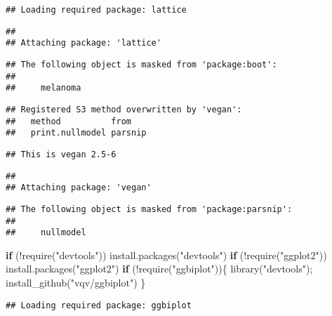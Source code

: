 \documentclass[
]{book}
\newenvironment{Shaded}{\begin{snugshade}}{\end{snugshade}}
\newcommand{\ControlFlowTok}[1]{\textcolor[rgb]{0.13,0.29,0.53}{\textbf{#1}}}
\newcommand{\FunctionTok}[1]{\textcolor[rgb]{0.00,0.00,0.00}{#1}}
\newcommand{\NormalTok}[1]{#1}
\newcommand{\SpecialCharTok}[1]{\textcolor[rgb]{0.00,0.00,0.00}{#1}}
\newcommand{\StringTok}[1]{\textcolor[rgb]{0.31,0.60,0.02}{#1}}
\begin{document}
\begin{verbatim}
## Loading required package: lattice
\end{verbatim}

\begin{verbatim}
## 
## Attaching package: 'lattice'
\end{verbatim}

\begin{verbatim}
## The following object is masked from 'package:boot':
## 
##     melanoma
\end{verbatim}

\begin{verbatim}
## Registered S3 method overwritten by 'vegan':
##   method          from   
##   print.nullmodel parsnip
\end{verbatim}

\begin{verbatim}
## This is vegan 2.5-6
\end{verbatim}

\begin{verbatim}
## 
## Attaching package: 'vegan'
\end{verbatim}

\begin{verbatim}
## The following object is masked from 'package:parsnip':
## 
##     nullmodel
\end{verbatim}

\begin{Shaded}
\begin{Highlighting}[]
\ControlFlowTok{if}\NormalTok{ (}\SpecialCharTok{!}\FunctionTok{require}\NormalTok{(}\StringTok{"devtools"}\NormalTok{)) }\FunctionTok{install.packages}\NormalTok{(}\StringTok{"devtools"}\NormalTok{)}
\ControlFlowTok{if}\NormalTok{ (}\SpecialCharTok{!}\FunctionTok{require}\NormalTok{(}\StringTok{"ggplot2"}\NormalTok{)) }\FunctionTok{install.packages}\NormalTok{(}\StringTok{"ggplot2"}\NormalTok{)}
\ControlFlowTok{if}\NormalTok{ (}\SpecialCharTok{!}\FunctionTok{require}\NormalTok{(}\StringTok{"ggbiplot"}\NormalTok{))\{ }\FunctionTok{library}\NormalTok{(}\StringTok{"devtools"}\NormalTok{); }\FunctionTok{install\_github}\NormalTok{(}\StringTok{"vqv/ggbiplot"}\NormalTok{) \}}
\end{Highlighting}
\end{Shaded}

\begin{verbatim}
## Loading required package: ggbiplot
\end{verbatim}
\end{document}
